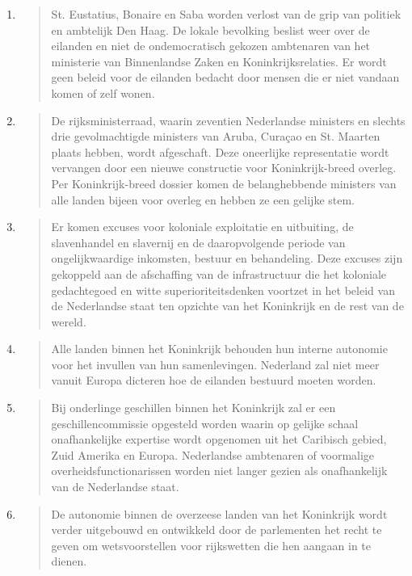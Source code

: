 \begin{enumerate}
\def\labelenumi{\arabic{enumi}.}
\item
  \begin{quote}
  St. Eustatius, Bonaire en Saba worden verlost van de grip van politiek
  en ambtelijk Den Haag. De lokale bevolking beslist weer over de
  eilanden en niet de ondemocratisch gekozen ambtenaren van het
  ministerie van Binnenlandse Zaken en Koninkrijksrelaties. Er wordt
  geen beleid voor de eilanden bedacht door mensen die er niet vandaan
  komen of zelf wonen.
  \end{quote}
\item
  \begin{quote}
  De rijksministerraad, waarin zeventien Nederlandse ministers en
  slechts drie gevolmachtigde ministers van Aruba, Curaçao en St.
  Maarten plaats hebben, wordt afgeschaft. Deze oneerlijke representatie
  wordt vervangen door een nieuwe constructie voor Koninkrijk-breed
  overleg. Per Koninkrijk-breed dossier komen de belanghebbende
  ministers van alle landen bijeen voor overleg en hebben ze een gelijke
  stem.
  \end{quote}
\item
  \begin{quote}
  Er komen excuses voor koloniale exploitatie en uitbuiting, de
  slavenhandel en slavernij en de daaropvolgende periode van
  ongelijkwaardige inkomsten, bestuur en behandeling. Deze excuses zijn
  gekoppeld aan de afschaffing van de infrastructuur die het koloniale
  gedachtegoed en witte superioriteitsdenken voortzet in het beleid van
  de Nederlandse staat ten opzichte van het Koninkrijk en de rest van de
  wereld.
  \end{quote}
\item
  \begin{quote}
  Alle landen binnen het Koninkrijk behouden hun interne autonomie voor
  het invullen van hun samenlevingen. Nederland zal niet meer vanuit
  Europa dicteren hoe de eilanden bestuurd moeten worden.
  \end{quote}
\item
  \begin{quote}
  Bij onderlinge geschillen binnen het Koninkrijk zal er een
  geschillencommissie opgesteld worden waarin op gelijke schaal
  onafhankelijke expertise wordt opgenomen uit het Caribisch gebied,
  Zuid Amerika en Europa. Nederlandse ambtenaren of voormalige
  overheidsfunctionarissen worden niet langer gezien als onafhankelijk
  van de Nederlandse staat.
  \end{quote}
\item
  \begin{quote}
  De autonomie binnen de overzeese landen van het Koninkrijk wordt
  verder uitgebouwd en ontwikkeld door de parlementen het recht te geven
  om wetsvoorstellen voor rijkswetten die hen aangaan in te dienen.
  \end{quote}
\end{enumerate}

